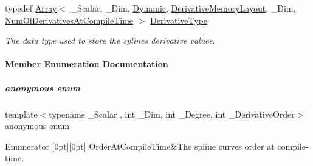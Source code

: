 \begin{DoxyCompactItemize}
typedef \hyperlink{group___core___module_class_eigen_1_1_array}{Array}$<$ \+\_\+\+Scalar, \+\_\+\+Dim, \hyperlink{namespace_eigen_ad81fa7195215a0ce30017dfac309f0b2}{Dynamic}, \hyperlink{group___splines___module_a3d4de3f96ecb4755e1d7782bf8275c5daf506b7fd844ab8dfe5262f915e713b28}{Derivative\+Memory\+Layout}, \+\_\+\+Dim, \hyperlink{group___splines___module_a96228f861ee39497b9092c6fd20eed35a24665032b11607201b7f394588f03f05}{Num\+Of\+Derivatives\+At\+Compile\+Time} $>$ \hyperlink{group___splines___module_a5e0a0e3b07c844c84cf164a7f0db9314}{Derivative\+Type}
\begin{DoxyCompactList}\small\item\em The data type used to store the spline\textquotesingle{}s derivative values. \end{DoxyCompactList}\end{DoxyCompactItemize}


\paragraph{Member Enumeration Documentation}
\mbox{\label{group___splines___module_a426db71a3c0b36612af57e0adcf0ea9b}} 
\subparagraph{\texorpdfstring{anonymous enum}{anonymous enum}}
{\footnotesize\ttfamily template$<$typename \+\_\+\+Scalar , int \+\_\+\+Dim, int \+\_\+\+Degree, int \+\_\+\+Derivative\+Order$>$ \\
anonymous enum}

\begin{DoxyEnumFields}{Enumerator}
[0pt][0pt]{}\mbox{\label{group___splines___module_a426db71a3c0b36612af57e0adcf0ea9baf038b6f42400b01b8037c2e3a092023c}} 
Order\+At\+Compile\+Time&The spline curve\textquotesingle{}s order at compile-\/time. \\
\hline

\end{DoxyEnumFields}


